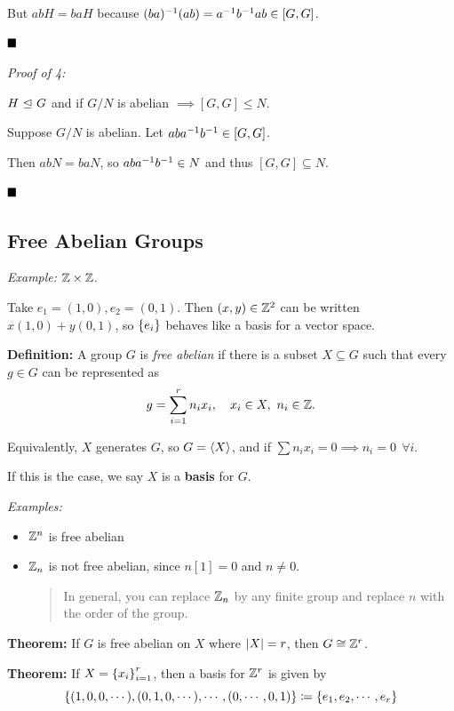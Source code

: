But \(abH = baH\) because \((ba)^{-1}(ab) = a^{-1} b^{-1} a b \in [G, G]\).

\(\qed\)

\emph{Proof of 4:}

\(H {~\trianglelefteq~} G\) and if \(G/N\) is abelian \(\implies [G, G] \leq N\).

Suppose \(G/N\) is abelian. Let \(aba^{-1} b^{-1} \in [G, G]\).

Then \(abN = baN\), so \(aba^{-1} b^{-1} \in N\) and thus
\([G, G] \subseteq N\).

\(\qed\)

\hypertarget{free-abelian-groups}{%
\subsection{Free Abelian Groups}\label{free-abelian-groups}}

\emph{Example:} \({\mathbb{Z}} \times {\mathbb{Z}}\).

Take \(e_1 = (1, 0), e_2 = (0, 1)\). Then \((x,y) \in {\mathbb{Z}}^2\) can be
written \(x(1,0) + y(0, 1)\), so \(\left\{{e_i}\right\}\) behaves like a basis
for a vector space.

\textbf{Definition:} A group \(G\) is \emph{free abelian} if there is a
subset \(X\subseteq G\) such that every \(g \in G\) can be represented
as \[
g = \sum_{i=1}^r n_i x_i,\quad x_i \in X,~n_i \in {\mathbb{Z}}.
\]

Equivalently, \(X\) generates \(G\), so \(G = \left\langle{X}\right\rangle\), and if
\(\sum n_i x_i = 0 \implies n_i = 0~~\forall i\).

If this is the case, we say \(X\) is a \textbf{basis} for \(G\).

\emph{Examples:}

\begin{itemize}
\item
  \({\mathbb{Z}}^n\) is free abelian
\item
  \({\mathbb{Z}}_n\) is not free abelian, since \(n [1] = 0\) and \(n\neq 0\).

  \begin{quote}
  In general, you can replace \({\mathbb{Z}}_n\) by any finite group and replace
  \(n\) with the order of the group.
  \end{quote}
\end{itemize}

\textbf{Theorem:} If \(G\) is free abelian on \(X\) where
\({\left\lvert {X} \right\rvert} = r\), then \(G \cong {\mathbb{Z}}^r\).

\textbf{Theorem:} If \(X = \left\{{x_i}\right\}_{i=1}^r\), then a basis for
\({\mathbb{Z}}^r\) is given by \[
\left\{{(1, 0, 0, \cdots), (0, 1, 0, \cdots), \cdots, (0, \cdots, 0, 1)}\right\} \coloneqq \left\{{e_1, e_2, \cdots, e_r}\right\}
\]

